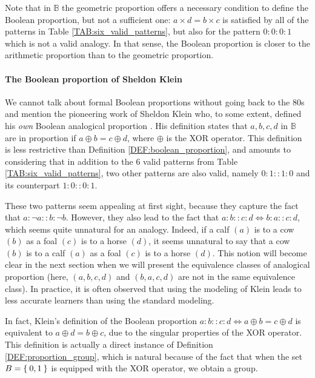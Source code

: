 Note that in $\mathbb{B}$ the geometric proportion offers a necessary condition
to define the Boolean proportion, but not a sufficient one: $a \times d =
b\times c$ is satisfied by all of the patterns in Table
\ref{TAB:six_valid_patterns}, but also for the pattern $0: 0: 0: 1$ which is
not a valid analogy. In that sense, the Boolean proportion is closer to the
arithmetic proportion than to the geometric proportion.

\paragraph{The Boolean proportion of Sheldon Klein\\}

We cannot talk about formal Boolean proportions without going back to the 80s
and mention the pioneering work of Sheldon Klein who, to some extent, defined
his \textit{own} Boolean analogical proportion \cite{Kle83}. His definition
states that $a, b, c, d$ in $\mathbb{B}$ are in proportion if $a \oplus b = c
\oplus d$, where $\oplus$ is the XOR operator.  This definition is less
restrictive than Definition \ref{DEF:boolean_proportion}, and amounts to
considering that in addition to the $6$ valid patterns from Table
\ref{TAB:six_valid_patterns}, two other patterns are also valid, namely
$0:1::1:0$ and its counterpart $1:0::0:1$.

These two patterns seem appealing at first sight, because they capture the fact
that $a : \neg a :: b : \neg b$. However, they also lead to the fact that
$a:b::c:d \iff b : a :: c :d$, which seems quite unnatural for an analogy.
Indeed, if a calf $(a)$ is to a cow $(b)$ as a foal $(c)$ is to a horse $(d)$,
it seems unnatural to say that a cow $(b)$ is to a calf $(a)$ as a foal $(c)$
is to a horse $(d)$. This notion will become clear in the next section when we
will present the equivalence classes of analogical proportion (here, $(a, b, c,
d)$ and $(b, a, c, d)$ are not in the same equivalence class).  In practice, it
is often observed that using the modeling of Klein leads to less accurate
learners than using the standard modeling.

In fact, Klein's definition of the Boolean proportion $a:b::c:d \iff a
\oplus b = c \oplus d$ is equivalent to $a \oplus d = b \oplus c$, due to the
singular properties of the XOR operator. This definition is actually a direct
instance of Definition \ref{DEF:proportion_group}, which is natural because of
the fact that when the set $B = \Set{0, 1}$ is equipped with the XOR operator,
we obtain a group.


